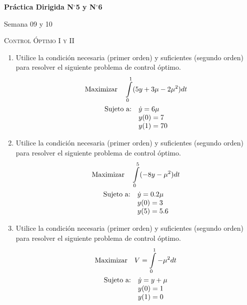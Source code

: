 \documentclass[10pt,a4paper]{article}
\begin{document}
	\begin{center}
		{\Large {\textbf{Práctica Dirigida N$^{\circ}$5 y N$^{\circ}$6}}}
		
		\small{Semana 09 y 10}
		
		\textsc{Control Óptimo I y II}
		
	\end{center}
	
	\begin{enumerate}
		\item Utilice la condición necesaria (primer orden) y suficientes (segundo orden) 
		para resolver el siguiente problema de control óptimo.
		\begin{gather*}
			\textup{Maximizar}\quad \int\limits_{0}^{1}(5y+3\mu-2\mu^2)dt\\
			\begin{array}{lllll}
				\textup{Sujeto a:}	&	\dot{y}=6\mu \\
				&	y(0)=7 \\
				&	y(1)=70
			\end{array}
		\end{gather*}
		\item Utilice la condición necesaria (primer orden) y suficientes (segundo orden) 
		para resolver el siguiente problema de control óptimo.
		\begin{gather*}
			\textup{Maximizar}\quad \int\limits_{0}^{5}(-8y-\mu ^2)dt\\
			\begin{array}{lllll}
				\textup{Sujeto a:}	&	\dot{y}=0.2\mu \\
				&	y(0)=3 \\
				&	y(5)=5.6
			\end{array}
		\end{gather*}
		\item Utilice la condición necesaria (primer orden) y suficientes (segundo orden) 
		para resolver el siguiente problema de control óptimo.
		\begin{gather*}
			\textup{Maximizar}\quad V=\int\limits_{0}^{1}-\mu ^2dt\\
			\begin{array}{lllll}
				\textup{Sujeto a:}	&	\dot{y}=y+\mu \\
				&	y(0)=1 \\
				&	y(1)=0
			\end{array}

\end{gather*}
\end{enumerate}
\end{document}
